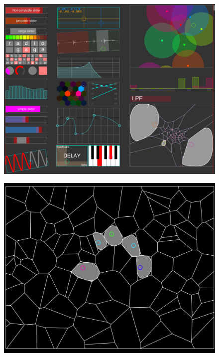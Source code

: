 \begin{figure}
	\centering
	\begin{minipage}{.5\textwidth}
		\includegraphics[width=.98\linewidth]{gfx/mpTUI/mp-TUI-preview.png}
		\label{fig:visual_representation:overview}
	\end{minipage}%
	\begin{minipage}{.5\textwidth}
		\includegraphics[width=.98\linewidth]{gfx/mpTUI/mp-TUI-voronoi.png}
		\label{fig:visual_representation:voronoi}
	\end{minipage}
\end{figure}



